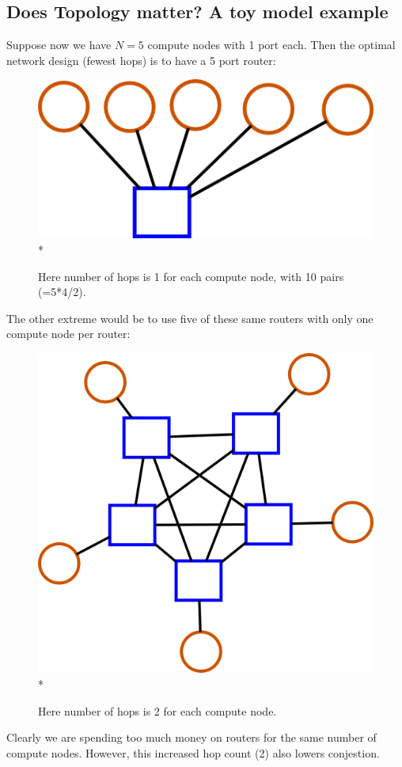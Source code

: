 \documentclass[pdftex]{article}
\begin{document}
\subsection{Does Topology matter? A toy model example}

Suppose now we have $N=5$ compute nodes with 1 port each. Then the optimal network design (fewest hops) is to have a 5 port router:
\begin{figure}[h!]
\begin{center}
\includegraphics[scale=0.2]{pictures/N5_n1_M1_m5.png}\\*
\caption{Here number of hops is 1 for each compute node, with 10 pairs (=5*4/2).}
\end{center}
\end{figure}

The other extreme would be to use five of these same routers with only one compute node per router:
\begin{figure}[h!]
\begin{center}
\includegraphics[scale=0.2]{pictures/N5_n1_M5_m5.png}\\*
\caption{Here number of hops is 2 for each compute node.}
\end{center}
\end{figure}
Clearly we are spending too much money on routers for the same number of compute nodes. However, this increased hop count (2) also lowers conjestion.
\end{document}
